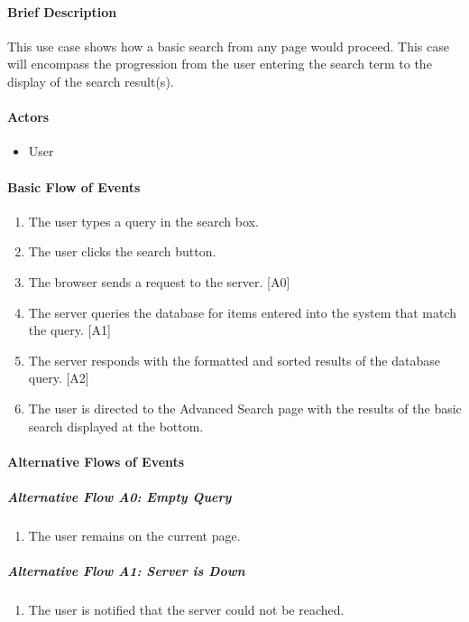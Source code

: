 \documentclass{article}
\begin{document}
\paragraph{Brief Description}
This use case shows how a basic search from any page  would proceed. This case will encompass the progression from the user entering the search term to the display of the search result(s).

\paragraph{Actors}
\begin{itemize}
\item User
\end{itemize}

\paragraph{Basic Flow of Events}
\begin{enumerate}
\item The user types a query in the search box.
\item The user clicks the search button.
\item The browser sends a request to the server. [A0]
\item The server queries the database for items entered into the system that match the query. [A1]
\item The server responds with the formatted and sorted results of the database query. [A2]
\item The user is directed to the Advanced Search page with the results of the basic search displayed at the bottom.
\end{enumerate}

\paragraph{Alternative Flows of Events}

\subparagraph{Alternative Flow A0: Empty Query}
\begin{enumerate}
\item The user remains on the current page.
\end{enumerate}

\subparagraph{Alternative Flow A1: Server is Down}
\begin{enumerate}
\item The user is notified that the server could not be reached.
\end{enumerate}
\end{document}

